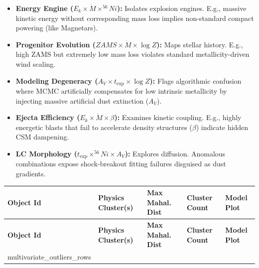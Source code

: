 \documentclass[11pt,a4paper]{article}
\begin{document}
\begin{itemize}
    \item \textbf{Energy Engine ($E_k \times \dot{M} \times ^{56}Ni$):} Isolates explosion engines. E.g., massive kinetic energy without corresponding mass loss implies non-standard compact powering (like Magnetars).
    \item \textbf{Progenitor Evolution ($ZAMS \times \dot{M} \times \log Z$):} Maps stellar history. E.g., high ZAMS but extremely low mass loss violates standard metallicity-driven wind scaling.
    \item \textbf{Modeling Degeneracy ($A_V \times t_{\exp} \times \log Z$):} Flags algorithmic confusion where MCMC artificially compensates for low intrinsic metallicity by injecting massive artificial dust extinction ($A_V$).
    \item \textbf{Ejecta Efficiency ($E_k \times \dot{M} \times \beta$):} Examines kinetic coupling. E.g., highly energetic blasts that fail to accelerate density structures ($\beta$) indicate hidden CSM dampening.
    \item \textbf{LC Morphology ($t_{\exp} \times ^{56}Ni \times A_V$):} Explores diffusion. Anomalous combinations expose shock-breakout fitting failures disguised as dust gradients.
\end{itemize}

\begin{longtable}{@{}l p{5.5cm} l l l@{}}
\toprule
\textbf{Object Id} & \textbf{Physics Cluster(s)} & \textbf{Max Mahal. Dist} & \textbf{Cluster Count} & \textbf{Model Plot} \\ \midrule
\endfirsthead
\toprule
\textbf{Object Id} & \textbf{Physics Cluster(s)} & \textbf{Max Mahal. Dist} & \textbf{Cluster Count} & \textbf{Model Plot} \\ \midrule
\endhead
\bottomrule
\endfoot
{multivariate_outliers_rows}\end{longtable}
\end{document}
